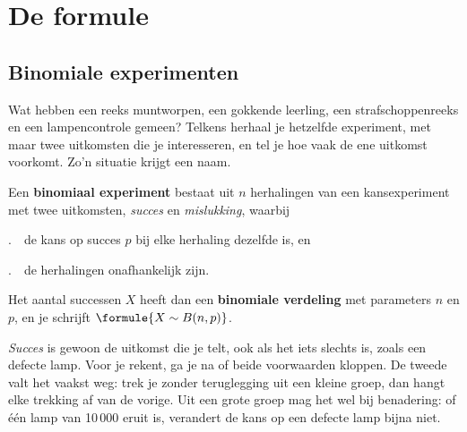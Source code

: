 \begin{oefeningen}[Start]

\end{oefeningen}


\section{De formule}

\subsection{Binomiale experimenten}

Wat hebben een reeks muntworpen, een gokkende leerling, een strafschoppenreeks en een lampencontrole gemeen? Telkens herhaal je hetzelfde experiment, met maar twee uitkomsten die je interesseren, en tel je hoe vaak de ene uitkomst voorkomt. Zo'n situatie krijgt een naam.

\begin{theorie}
Een \textbf{\textcolor{accent}{binomiaal experiment}} bestaat uit $n$ herhalingen van een kansexperiment met twee uitkomsten, \textit{succes} en \textit{mislukking}, waarbij

\vspace{1mm}
.\ \ de kans op succes $p$ bij elke herhaling dezelfde is, en

.\ \ de herhalingen onafhankelijk zijn.

\vspace{1mm}
Het aantal successen $X$ heeft dan een \textbf{\textcolor{accent}{binomiale verdeling}} met parameters $n$ en $p$, en je schrijft $\formule{X \sim B(n, p)}$.
\end{theorie}

\textit{Succes} is gewoon de uitkomst die je telt, ook als het iets slechts is, zoals een defecte lamp. Voor je rekent, ga je na of beide voorwaarden kloppen. De tweede valt het vaakst weg: trek je zonder teruglegging uit een kleine groep, dan hangt elke trekking af van de vorige. Uit een grote groep mag het wel bij benadering: of één lamp van 10\,000 eruit is, verandert de kans op een defecte lamp bijna niet.

